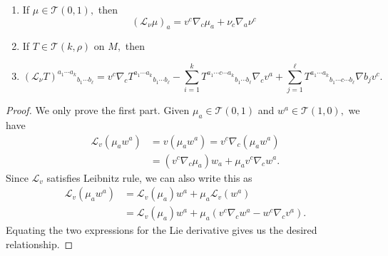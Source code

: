 \documentclass{article}
\numberwithin{equation}{section}
\begin{document}
\begin{corollary}
    \begin{enumerate}[label=(\alph*)]
        \item If $\mu \in \mathcal{T}(0,1),$ then 
        \begin{equation*}
            (\mathcal{L}_\nu\mu)_a = v^c \nabla_c \mu_a + \nu_c \nabla_a \nu^c
        \end{equation*}
        \item If $T\in \mathcal{T}(k,\rho)$ on $M,$ then 
        \item \begin{equation*}
            \left(\mathcal{L}_\nu T\right)^{a_1\cdots a_k}{}_{b_1\cdots b_\ell} = v^c\nabla_c T^{a_1\cdots a_k}{}_{b_1\cdots b_\ell} - \sum_{i=1}^k T^{a_1\cdots c \cdots a_k}{}_{b_1\cdots b_\ell} \nabla_c v^a + \sum_{j=1}^{\ell} T^{a_1\cdots a_k}{}_{b_1\cdots c \cdots b_\ell} \nabla b_j v^c.
        \end{equation*}
    \end{enumerate}
\end{corollary}
\begin{proof}
    We only prove the first part. Given $\mu_a \in \mathcal{T}(0,1)$ and $w^a\in \mathcal{T}(1,0),$ we have 
    \begin{align*}
        \mathcal{L}_v(\mu_a w^a) &= v(\mu_aw^a) = v^c\nabla_c(\mu_a w^a) \\ 
        &= (v^c\nabla_c \mu_a)w_a + \mu_a v^c \nabla_c w^a.
    \end{align*}
    Since $\mathcal{L}_v$ satisfies Leibnitz rule, we can also write this as 
    \begin{align*}
        \mathcal{L}_v(\mu_aw^a) &= \mathcal{L}_v(\mu_a)w^a + \mu_a \mathcal{L}_v(w^a) \\ 
        &= \mathcal{L}_v(\mu_a)w^a + \mu_a\left(v^c\nabla_c w^a - w^c\nabla_c v^a\right).
    \end{align*}
    Equating the two expressions for the Lie derivative gives us the desired relationship.
\end{proof}
\end{document}
